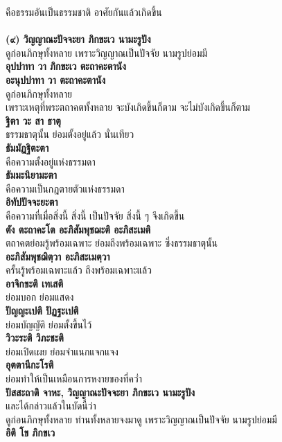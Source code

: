 \documentclass[12pt]{article}
\begin{document}
\indent คือธรรมอันเป็นธรรมชาติ อาศัยกันแล้วเกิดขึ้น\\
\\
\textbf{(๙) วิญญาณะปัจจะยา ภิกขะเว นามะรูปัง}\\
\indent ดูก่อนภิกษุทั้งหลาย เพราะวิญญาณเป็นปัจจัย นามรูปย่อมมี\\
\textbf{อุปปาทา วา ภิกขะเว ตะถาคะตานัง\\
อะนุปปาทา วา ตะถาคะตานัง}\\
\indent ดูก่อนภิกษุทั้งหลาย\\
\indent เพราะเหตุที่พระตถาคตทั้งหลาย จะบังเกิดขึ้นก็ตาม จะไม่บังเกิดขึ้นก็ตาม\\
\textbf{ฐิตา วะ สา ธาตุ}\\
\indent ธรรมธาตุนั้น ย่อมตั้งอยู่แล้ว นั่นเทียว\\
\textbf{ธัมมัฏฐิตะตา}\\
\indent คือความตั้งอยู่แห่งธรรมดา\\
\textbf{ธัมมะนิยามะตา}\\
\indent คือความเป็นกฎตายตัวแห่งธรรมดา\\
\textbf{อิทัปปัจจะยะตา}\\
\indent คือความที่เมื่อสิ่งนี้ สิ่งนี้ เป็นปัจจัย สิ่งนี้ ๆ จึงเกิดขึ้น\\
\textbf{ตัง ตะถาคะโต อะภิสัมพุชฌะติ อะภิสะเมติ}\\
\indent ตถาคตย่อมรู้พร้อมเฉพาะ ย่อมถึงพร้อมเฉพาะ ซึ่งธรรมธาตุนั้น\\
\textbf{อะภิสัมพุชฌิตฺวา อะภิสะเมตฺวา}\\
\indent ครั้นรู้พร้อมเฉพาะแล้ว ถึงพร้อมเฉพาะแล้ว\\
\textbf{อาจิกขะติ เทเสติ}\\
\indent ย่อมบอก ย่อมแสดง\\
\textbf{ปัญญะเปติ ปัฏฐะเปติ}\\
\indent ย่อมบัญญัติ ย่อมตั้งขึ้นไว้\\
\textbf{วิวะระติ วิภะชะติ}\\
\indent ย่อมเปิดเผย ย่อมจำแนกแจกแจง\\
\textbf{อุตตานีกะโรติ}\\
\indent ย่อมทำให้เป็นเหมือนการหงายของที่คว่ำ\\
\textbf{ปัสสะถาติ จาหะ, วิญญาณะปัจจะยา ภิกขะเว นามะรูปัง}\\
\indent และได้กล่าวแล้วในบัดนี้ว่า \\
\indent ดูก่อนภิกษุทั้งหลาย ท่านทั้งหลายจงมาดู เพราะวิญญาณเป็นปัจจัย นามรูปย่อมมี\\
\textbf{อิติ โข ภิกขเว}\\
\end{document}

